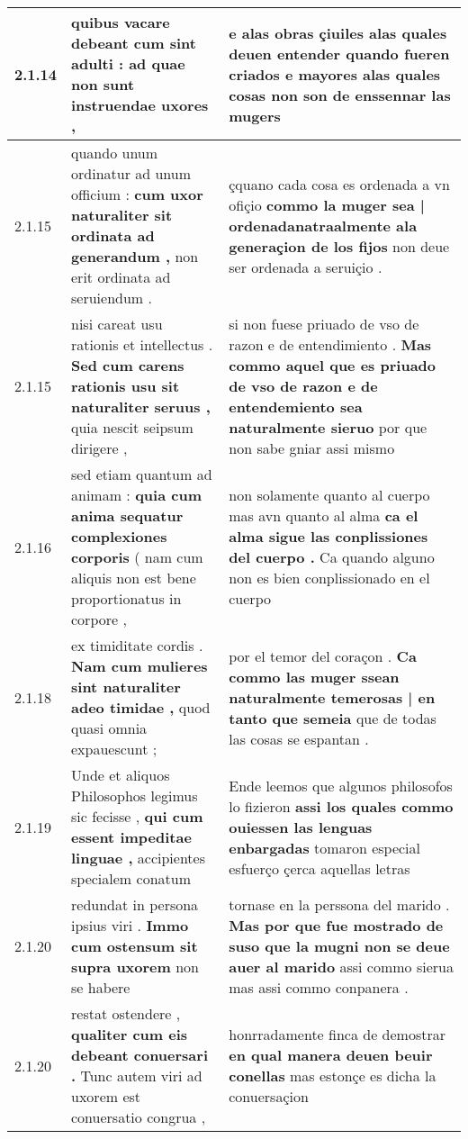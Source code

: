 \begin{tabular}{|p{1cm}|p{6.5cm}|p{6.5cm}|}
2.1.14 & quibus vacare debeant \textbf{ cum sint adulti : } ad quae non sunt instruendae uxores , & e alas obras çiuiles alas quales deuen entender \textbf{ quando fueren criados } e mayores alas quales cosas non son de enssennar las mugers \\\hline
2.1.15 & quando unum ordinatur ad unum officium : \textbf{ cum uxor naturaliter sit ordinata ad generandum , } non erit ordinata ad seruiendum . & çquano cada cosa es ordenada a vn ofiçio \textbf{ commo la muger sea | ordenadanatraalmente ala generaçion de los fijos } non deue ser ordenada a seruiçio . \\\hline
2.1.15 & nisi careat usu rationis et intellectus . \textbf{ Sed cum carens rationis usu sit naturaliter seruus , } quia nescit seipsum dirigere , & si non fuese priuado de vso de razon e de entendimiento . \textbf{ Mas commo aquel que es priuado de vso de razon e de entendemiento sea naturalmente sieruo } por que non sabe gniar assi mismo \\\hline
2.1.16 & sed etiam quantum ad animam : \textbf{ quia cum anima sequatur complexiones corporis } ( nam cum aliquis non est bene proportionatus in corpore , & non solamente quanto al cuerpo mas avn quanto al alma \textbf{ ca el alma sigue las conplissiones del cuerpo . } Ca quando alguno non es bien conplissionado en el cuerpo \\\hline
2.1.18 & ex timiditate cordis . \textbf{ Nam cum mulieres sint naturaliter adeo timidae , } quod quasi omnia expauescunt ; & por el temor del coraçon . \textbf{ Ca commo las muger ssean naturalmente temerosas | en tanto que semeia } que de todas las cosas se espantan . \\\hline
2.1.19 & Unde et aliquos Philosophos legimus sic fecisse , \textbf{ qui cum essent impeditae linguae , } accipientes specialem conatum & Ende leemos que algunos philosofos lo fizieron \textbf{ assi los quales commo ouiessen las lenguas enbargadas } tomaron especial esfuerço çerca aquellas letras \\\hline
2.1.20 & redundat in persona ipsius viri . \textbf{ Immo cum ostensum sit supra uxorem } non se habere & tornase en la perssona del marido . \textbf{ Mas por que fue mostrado de suso que la mugni non se deue auer al marido } assi commo sierua mas assi commo conpanera . \\\hline
2.1.20 & restat ostendere , \textbf{ qualiter cum eis debeant conuersari . } Tunc autem viri ad uxorem est conuersatio congrua , & honrradamente finca de demostrar \textbf{ en qual manera deuen beuir conellas } mas estonçe es dicha la conuersaçion \\\hline

\end{tabular}
